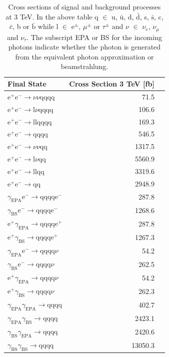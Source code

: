 \begin{table}[h!]
\centering
\begin{tabular}{ l r r }
\hline
Final State & Cross Section 3 TeV [fb]  \\ 
\hline
$\text{e}^{+}\text{e}^{-} \rightarrow \nu{\nu}\text{qqqq}$ & 71.5 \\
$\text{e}^{+}\text{e}^{-} \rightarrow \text{l}\nu\text{qqqq}$ & 106.6 \\
$\text{e}^{+}\text{e}^{-} \rightarrow \text{llqqqq}$ & 169.3 \\
$\text{e}^{+}\text{e}^{-} \rightarrow \text{qqqq}$ & 546.5 \\
$\text{e}^{+}\text{e}^{-} \rightarrow \nu{\nu}\text{qq}$ & 1317.5 \\
$\text{e}^{+}\text{e}^{-} \rightarrow \text{l}\nu\text{qq}$ & 5560.9 \\
$\text{e}^{+}\text{e}^{-} \rightarrow \text{llqq}$ & 3319.6 \\
$\text{e}^{+}\text{e}^{-} \rightarrow \text{qq}$ & 2948.9 \\
$\gamma_{\text{EPA}}\text{e}^{-} \rightarrow \text{qqqq}\text{e}^{-}$ & 287.8 \\
$\gamma_{\text{BS}}\text{e}^{-} \rightarrow \text{qqqq}\text{e}^{-}$ & 1268.6 \\
$\text{e}^{+}\gamma_{\text{EPA}} \rightarrow \text{qqqq}\text{e}^{+}$ & 287.8 \\
$\text{e}^{+}\gamma_{\text{BS}} \rightarrow \text{qqqq}\text{e}^{+}$ & 1267.3 \\
$\gamma_{\text{EPA}}\text{e}^{-} \rightarrow \text{qqqq}\nu$ & 54.2 \\
$\gamma_{\text{BS}}\text{e}^{-} \rightarrow \text{qqqq}\nu$ & 262.5 \\
$\text{e}^{+}\gamma_{\text{EPA}} \rightarrow \text{qqqq}\nu$ & 54.2 \\
$\text{e}^{+}\gamma_{\text{BS}} \rightarrow \text{qqqq}\nu$ & 262.3 \\
$\gamma_{\text{EPA}}\gamma_{\text{EPA}} \rightarrow \text{qqqq}$ & 402.7 \\
$\gamma_{\text{EPA}}\gamma_{\text{BS}} \rightarrow \text{qqqq}$ & 2423.1 \\
$\gamma_{\text{BS}}\gamma_{\text{EPA}} \rightarrow \text{qqqq}$ & 2420.6 \\
$\gamma_{\text{BS}}\gamma_{\text{BS}} \rightarrow \text{qqqq}$ & 13050.3 \\
\hline
\end{tabular}
\caption[Cross sections of signal and background processes at 3 TeV]{Cross sections of signal and background processes at 3 TeV. In the above table q $\in$ u, $\bar{\text{u}}$, d, $\bar{\text{d}}$, s, $\bar{\text{s}}$, c, $\bar{\text{c}}$, b or $\bar{\text{b}}$ while l $\in$ $\text{e}^{\pm}$, $\mu^{\pm}$ or $\tau^{\pm}$ and $\nu$ $\in$ $\nu_{e}$, $\nu_{\mu}$ and $\nu_{\tau}$.  The subscript EPA or BS for the incoming photons indicate whether the photon is generated from the equivalent photon approximation or beamstrahlung.}
\label{table:crosssection3000GeV}
\end{table}

